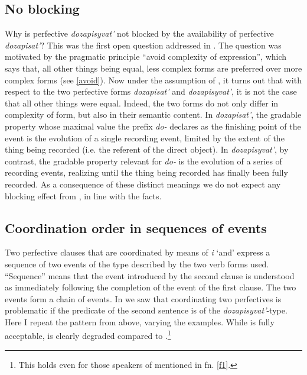 \documentclass[output=paper,
colorlinks,
citecolor=brown,
newtxmath
]{langscibook}
\begin{document}
\subsection{No blocking}
Why is perfective \textit{dozapisyvat'} not blocked by the availability of perfective \textit{dozapisat'}? This was the first open question addressed in . The question was motivated by the pragmatic principle ``avoid complexity of expression'', which says that, all other things being equal, less complex forms are preferred over more complex forms (see \ref{avoid}). Now under the assumption of , it turns out that with respect to the two perfective forms \textit{dozapisat'} and \textit{dozapisyvat'}, it is not the case that all other things were equal. Indeed, the two forms do not only differ in complexity of form, but also in their semantic content. In \textit{dozapisat'}, the gradable property whose maximal value the prefix \textit{do-} declares as the finishing point of the event is the evolution of a single recording event, limited by the extent of the thing being recorded (i.e. the referent of the direct object). In \textit{dozapisyvat'}, by contrast, the gradable property relevant for \textit{do-} is the evolution of a series of recording events, realizing until the thing being recorded has finally been fully recorded. As a consequence of these distinct meanings we do not expect any blocking effect from , in line with the facts.

\subsection{Coordination order in sequences of events}
Two perfective clauses that are coordinated by means of \textit{i} `and' express a sequence of two events of the type described by the two verb forms used. ``Sequence'' means that the event introduced by the second clause is understood as immediately following the completion of the event of the first clause. The two events form a chain of events. In  we saw that coordinating two perfectives is problematic if the predicate of the second sentence is of the \textit{dozapisyvat'}-type. Here I repeat the pattern from above, varying the examples. While  is fully acceptable,  is clearly degraded compared to .\footnote{This holds even for those speakers of  mentioned in fn. \ref{f1}.}
\end{document}

